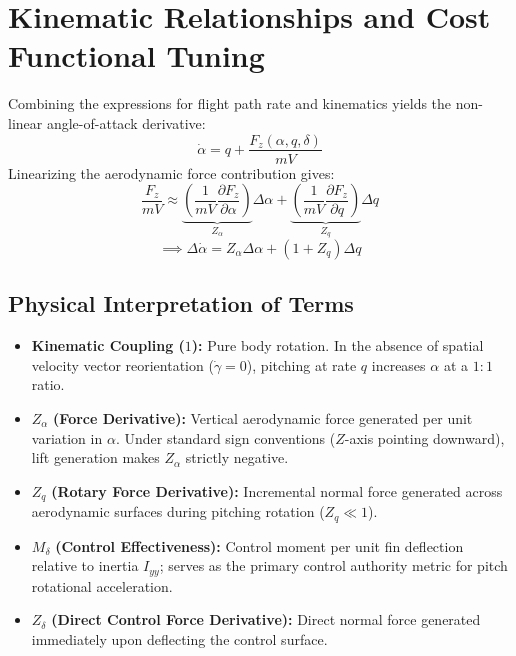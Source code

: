 \documentclass[11pt, a4paper]{article}
\begin{document}
\section{Kinematic Relationships and Cost Functional Tuning}

Combining the expressions for flight path rate and kinematics yields the non-linear angle-of-attack derivative:
\begin{equation}
\dot{\alpha} = q + \frac{F_z(\alpha, q, \delta)}{m V}
\end{equation}
Linearizing the aerodynamic force contribution gives:
\begin{equation}
\frac{F_z}{m V} \approx \underbrace{\left( \frac{1}{m V} \frac{\partial F_z}{\partial \alpha} \right)}_{Z_\alpha} \Delta \alpha + \underbrace{\left( \frac{1}{m V} \frac{\partial F_z}{\partial q} \right)}_{Z_q} \Delta q
\end{equation}
\begin{equation}
\implies \Delta \dot{\alpha} = Z_\alpha \Delta \alpha + (1 + Z_q) \Delta q
\end{equation}

\subsection*{Physical Interpretation of Terms}
\begin{itemize}
    \item \textbf{Kinematic Coupling ($1$):} Pure body rotation. In the absence of spatial velocity vector reorientation ($\dot{\gamma} = 0$), pitching at rate $q$ increases $\alpha$ at a $1:1$ ratio.
    \item $Z_\alpha$ \textbf{(Force Derivative):} Vertical aerodynamic force generated per unit variation in $\alpha$. Under standard sign conventions ($Z$-axis pointing downward), lift generation makes $Z_\alpha$ strictly negative.
    \item $Z_q$ \textbf{(Rotary Force Derivative):} Incremental normal force generated across aerodynamic surfaces during pitching rotation ($Z_q \ll 1$).
    \item $M_\delta$ \textbf{(Control Effectiveness):} Control moment per unit fin deflection relative to inertia $I_{yy}$; serves as the primary control authority metric for pitch rotational acceleration.
    \item $Z_\delta$ \textbf{(Direct Control Force Derivative):} Direct normal force generated immediately upon deflecting the control surface.
\end{itemize}
\end{document}

